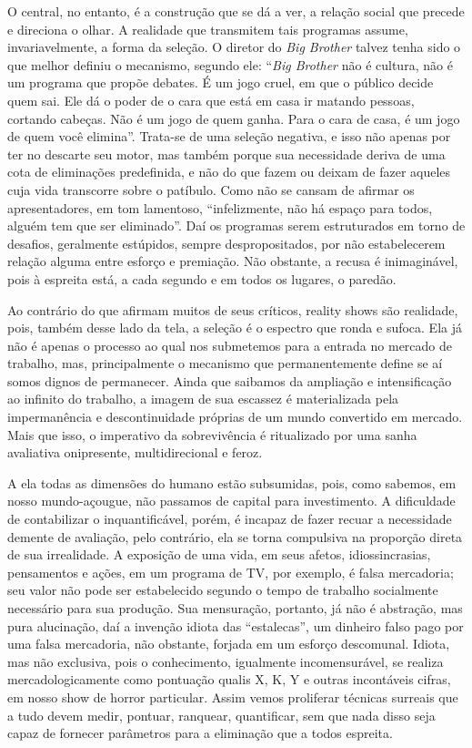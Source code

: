 O central, no entanto, é a construção que se dá a ver, a relação social
que precede e direciona o olhar. A realidade que transmitem tais
programas assume, invariavelmente, a forma da seleção. O diretor do
\emph{Big Brother} talvez tenha sido o que melhor definiu o mecanismo,
segundo ele: ``\emph{Big Brother} não é cultura, não é um programa que
propõe debates. É um jogo cruel, em que o público decide quem sai. Ele
dá o poder de o cara que está em casa ir matando pessoas, cortando
cabeças. Não é um jogo de quem ganha. Para o cara de casa, é um jogo de
quem você elimina''. Trata-se de uma seleção negativa, e isso não apenas
por ter no descarte seu motor, mas também porque sua necessidade deriva
de uma cota de eliminações predefinida, e não do que fazem ou deixam de
fazer aqueles cuja vida transcorre sobre o patíbulo. Como não se cansam
de afirmar os apresentadores, em tom lamentoso, ``infelizmente, não há
espaço para todos, alguém tem que ser eliminado''. Daí os programas
serem estruturados em torno de desafios, geralmente estúpidos, sempre
despropositados, por não estabelecerem relação alguma entre esforço e
premiação. Não obstante, a recusa é inimaginável, pois à espreita está,
a cada segundo e em todos os lugares, o paredão.

Ao contrário do que afirmam muitos de seus críticos, reality shows são
realidade, pois, também desse lado da tela, a seleção é o espectro que
ronda e sufoca. Ela já não é apenas o processo ao qual nos submetemos
para a entrada no mercado de trabalho, mas, principalmente o mecanismo
que permanentemente define se aí somos dignos de permanecer. Ainda que
saibamos da ampliação e intensificação ao infinito do trabalho, a imagem
de sua escassez é materializada pela impermanência e descontinuidade
próprias de um mundo convertido em mercado. Mais que isso, o imperativo
da sobrevivência é ritualizado por uma sanha avaliativa onipresente,
multidirecional e feroz.

A ela todas as dimensões do humano estão subsumidas, pois, como sabemos,
em nosso mundo-açougue, não passamos de capital para investimento. A
dificuldade de contabilizar o inquantificável, porém, é incapaz de fazer
recuar a necessidade demente de avaliação, pelo contrário, ela se torna
compulsiva na proporção direta de sua irrealidade. A exposição de uma
vida, em seus afetos, idiossincrasias, pensamentos e ações, em um
programa de TV, por exemplo, é falsa mercadoria; seu valor não pode ser
estabelecido segundo o tempo de trabalho socialmente necessário para sua
produção. Sua mensuração, portanto, já não é abstração, mas pura
alucinação, daí a invenção idiota das ``estalecas'', um dinheiro falso
pago por uma falsa mercadoria, não obstante, forjada em um esforço
descomunal. Idiota, mas não exclusiva, pois o conhecimento, igualmente
incomensurável, se realiza mercadologicamente como pontuação qualis X,
K, Y e outras incontáveis cifras, em nosso show de horror particular.
Assim vemos proliferar técnicas surreais que a tudo devem medir,
pontuar, ranquear, quantificar, sem que nada disso seja capaz de
fornecer parâmetros para a eliminação que a todos espreita.

